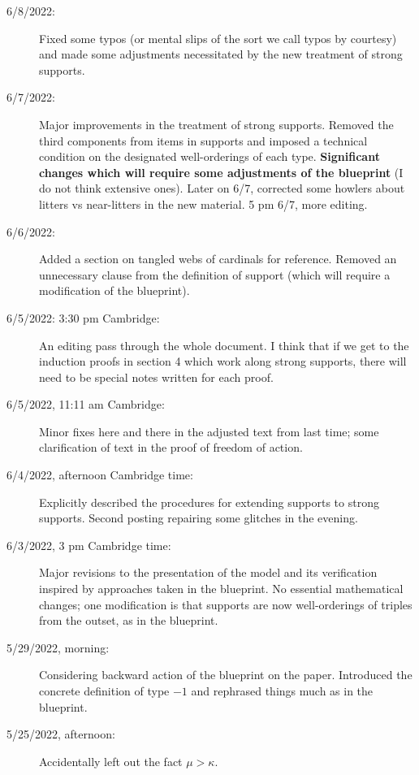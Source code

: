 \documentclass[112pt]{article}
\begin{document}
\begin{description}
\item[6/8/2022:]  Fixed some typos (or mental slips of the sort we call typos by courtesy) and made some adjustments necessitated by the new treatment of strong supports.

\item[6/7/2022:]  Major improvements in the treatment of strong supports.  Removed the third components from items in supports and imposed a technical condition on the designated well-orderings of each type.  {\bf Significant changes which will require some adjustments of the blueprint} (I do not think extensive ones).  Later on 6/7, corrected some howlers about litters vs near-litters in the new material.  5 pm 6/7, more editing.

\item[6/6/2022:]  Added a section on tangled webs of cardinals for reference.  Removed an unnecessary clause from the definition of support (which will require a modification of the blueprint).

\item[6/5/2022:  3:30 pm Cambridge:]  An editing pass through the whole document.  I think that if we get to the induction proofs in section 4 which work along strong supports, there will need to be special notes written for each proof.

\item[6/5/2022, 11:11 am Cambridge:]  Minor fixes here and there in the adjusted text from last time;  some clarification of text in the proof of freedom of action.

\item[6/4/2022, afternoon Cambridge time:]  Explicitly described the procedures for extending supports to strong supports.  Second posting repairing some glitches in the evening.

\item[6/3/2022, 3 pm Cambridge time:]  Major revisions to the presentation of the model and its verification inspired by approaches taken in the blueprint.  No essential mathematical changes;  one modification is that supports are now well-orderings of triples from the outset, as in the blueprint.

\item[5/29/2022, morning:]  Considering backward action of the blueprint on the paper.  Introduced the concrete definition of type $-1$ and rephrased things much as in the blueprint.

\item[5/25/2022, afternoon:]  Accidentally left out the fact $\mu>\kappa$.


\end{description}
\end{document}
